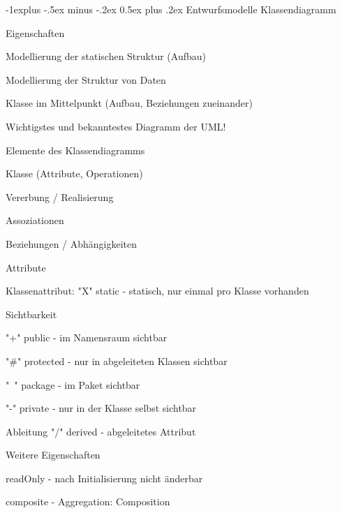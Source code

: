 \documentclass[a4paper]{article}
\makeatletter
\renewcommand{\subsection}{\@startsection{subsection}{2}{0mm}%
                                {-1explus -.5ex minus -.2ex}%
                                {0.5ex plus .2ex}%
                                {\normalfont\normalsize\bfseries}}
\makeatother
\begin{document}
\begin{multicols}{3}
  \subsection{Entwurfsmodelle}
  Klassendiagramm
  \begin{itemize*}
    \item Eigenschaften
          \begin{itemize*}
            \item Modellierung der statischen Struktur (Aufbau)
            \item Modellierung der Struktur von Daten
            \item Klasse im Mittelpunkt (Aufbau, Beziehungen zueinander)
            \item Wichtigstes und bekanntestes Diagramm der UML!
          \end{itemize*}
    \item Elemente des Klassendiagramms
          \begin{itemize*}
            \item Klasse (Attribute, Operationen)
            \item Vererbung / Realisierung
            \item Assoziationen
            \item Beziehungen / Abhängigkeiten
          \end{itemize*}
    \item Attribute
          \begin{itemize*}
            \item Klassenattribut: "X" static - statisch, nur einmal pro Klasse vorhanden
            \item Sichtbarkeit
            \item "+" public - im Namensraum sichtbar
            \item "\#" protected - nur in abgeleiteten Klassen sichtbar
            \item "~" package - im Paket sichtbar
            \item "-" private - nur in der Klasse selbst sichtbar
            \item Ableitung "/" derived - abgeleitetes Attribut
          \end{itemize*}
    \item Weitere Eigenschaften
          \begin{itemize*}
            \item readOnly - nach Initialisierung nicht änderbar
            \item composite - Aggregation: Composition

\end{itemize*}
\end{itemize*}
\end{multicols}
\end{document}
